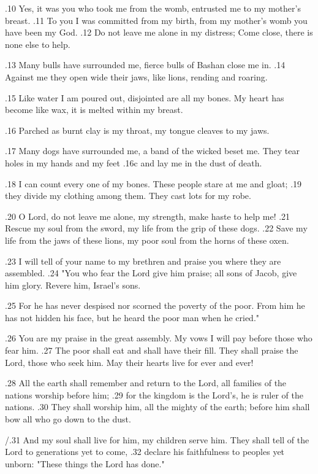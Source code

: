 .10 Yes, it was you who took me from the womb,
entrusted me to my mother's breast.
.11 To you I was committed from my birth,
from my mother's womb you have been my God.
.12 Do not leave me alone in my distress;
Come close, there is none else to help.

.13 Many bulls have surrounded me,
fierce bulls of Bashan close me in.
.14 Against me they open wide their jaws,
like lions, rending and roaring.

.15 Like water I am poured out,
disjointed are all my bones.
My heart has become like wax,
it is melted within my breast.

.16 Parched as burnt clay is my throat,
my tongue cleaves to my jaws.

.17 Many dogs have surrounded me,
a band of the wicked beset me.
They tear holes in my hands and my feet
.16c and lay me in the dust of death.

.18 I can count every one of my bones.
These people stare at me and gloat;
.19 they divide my clothing among them.
They cast lots for my robe.

.20 O Lord, do not leave me alone,
my strength, make haste to help me!
.21 Rescue my soul from the sword,
my life from the grip of these dogs.
.22 Save my life from the jaws of these lions,
my poor soul from the horns of these oxen.

.23 I will tell of your name to my brethren
and praise you where they are assembled.
.24 "You who fear the Lord give him praise;
all sons of Jacob, give him glory.
Revere him, Israel's sons.

.25 For he has never despised
nor scorned the poverty of the poor.
From him he has not hidden his face,
but he heard the poor man when he cried."

.26 You are my praise in the great assembly.
My vows I will pay before those who fear him.
.27 The poor shall eat and shall have their fill.
They shall praise the Lord, those who seek him.
May their hearts live for ever and ever!

.28 All the earth shall remember and return to the Lord,
all families of the nations worship before him;
.29 for the kingdom is the Lord's, he is ruler of the nations.
.30 They shall worship him, all the mighty of the earth;
before him shall bow all who go down to the dust.

/.31 And my soul shall live for him, my children serve him.
They shall tell of the Lord to generations yet to come,
.32 declare his faithfulness to peoples yet unborn:
"These things the Lord has done."


